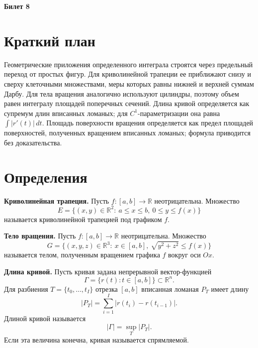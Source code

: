 \documentclass[12pt,a4paper]{article}
\newcommand{\R}{\mathbb{R}}
\begin{document}
\begin{center}
{\Large\bfseries Билет 8}
\end{center}

\noindent{}

\section*{Краткий план}

Геометрические приложения определенного интеграла строятся через предельный
переход от простых фигур. Для криволинейной трапеции ее приближают снизу и
сверху клеточными множествами, меры которых равны нижней и верхней суммам
Дарбу. Для тела вращения аналогично используют цилиндры, поэтому объем равен
интегралу площадей поперечных сечений. Длина кривой определяется как супремум
длин вписанных ломаных; для \(C^1\)-параметризации она равна
\(\int |r'(t)|\,dt\). Площадь поверхности вращения определяется как предел
площадей поверхностей, полученных вращением вписанных ломаных; формула
приводится без доказательства.

\section*{Определения}

\textbf{Криволинейная трапеция.}
Пусть \(f\colon [a,b]\to\R\) неотрицательна. Множество
\[
  E=\{(x,y)\in\R^2:\ a\le x\le b,\ 0\le y\le f(x)\}
\]
называется криволинейной трапецией под графиком \(f\).

\textbf{Тело вращения.}
Пусть \(f\colon [a,b]\to\R\) неотрицательна. Множество
\[
  G=
  \{(x,y,z)\in\R^3:\ x\in[a,b],\ \sqrt{y^2+z^2}\le f(x)\}
\]
называется телом, полученным вращением графика \(f\) вокруг оси \(Ox\).

\textbf{Длина кривой.}
Пусть кривая задана непрерывной вектор-функцией
\[
  \Gamma=\{r(t):t\in[a,b]\}\subset\R^n.
\]
Для разбиения \(T=\{t_0,\dots,t_I\}\) отрезка \([a,b]\) вписанная ломаная
\(P_T\) имеет длину
\[
  |P_T|=\sum_{i=1}^I |r(t_i)-r(t_{i-1})|.
\]
Длиной кривой называется
\[
  |\Gamma|=\sup_T |P_T|.
\]
Если эта величина конечна, кривая называется спрямляемой.
\end{document}
